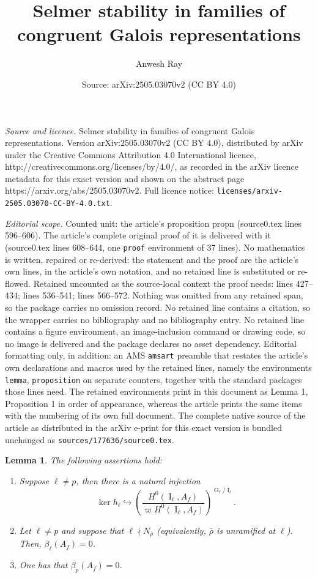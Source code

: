 \documentclass[10pt,a4paper]{amsart}
\title{Selmer stability in families of congruent Galois representations}
\author{Anwesh Ray}
\date{Source: arXiv:2505.03070v2 (CC BY 4.0)}
\newtheorem{lemma}{Lemma}
\newcommand{\op}[1]{\operatorname{#1}}
\begin{document}
\maketitle

\noindent\emph{Source and licence.} Selmer stability in families of congruent Galois representations. Version arXiv:2505.03070v2 (CC BY 4.0), distributed by arXiv under the Creative Commons Attribution 4.0 International licence, http://creativecommons.org/licenses/by/4.0/, as recorded in the arXiv licence metadata for this exact version and shown on the abstract page https://arxiv.org/abs/2505.03070v2. Full licence notice: \texttt{licenses/arxiv-2505.03070-CC-BY-4.0.txt}.\par\smallskip

\noindent\textit{Editorial scope.} Counted unit: the article's proposition propn (source0.tex lines 596--606). The article's complete original proof of it is delivered with it (source0.tex lines 608--644, one \texttt{proof} environment of 37 lines). No mathematics is written, repaired or re-derived: the statement and the proof are the article's own lines, in the article's own notation, and no retained line is substituted or re-flowed.  Retained uncounted as the source-local context the proof needs: lines 427--434; lines 536--541; lines 566--572.  Nothing was omitted from any retained span, so the package carries no omission record.  No retained line contains a citation, so the wrapper carries no bibliography and no bibliography entry.  No retained line contains a figure environment, an image-inclusion command or drawing code, so no image is delivered and the package declares no asset dependency.  Editorial formatting only, in addition: an AMS \texttt{amsart} preamble that restates the article's own declarations and macros used by the retained lines, namely the environments \texttt{lemma}, \texttt{proposition} on separate counters, together with the standard packages those lines need.  The retained environments print in this document as Lemma 1, Proposition 1 in order of appearance, whereas the article prints the same items with the numbering of its own full document.  The complete native source of the article as distributed in the arXiv e-print for this exact version is bundled unchanged as \texttt{sources/177636/source0.tex}.
\begin{lemma}\label{beta local lemma}
    The following assertions hold:
    \begin{enumerate}
        \item Suppose $\ell\neq p$, then there is a natural injection\begin{equation}\label{natural inj}\op{ker}h_\ell\hookrightarrow \left(\frac{H^0(\op{I}_\ell, A_f)}{\varpi H^0(\op{I}_\ell, A_f)}\right)^{\op{G}_\ell/\op{I}_\ell}.\end{equation}
        \item Let $\ell\neq p$ and suppose that $\ell\nmid N_{\bar{\rho}}$ (equivalently, $\bar{\rho}$ is unramified at $\ell$). Then, $\beta_\ell(A_f)=0$.
        \item One has that $\beta_p(A_f)=0$.
    \end{enumerate}
\end{lemma}
\end{document}
